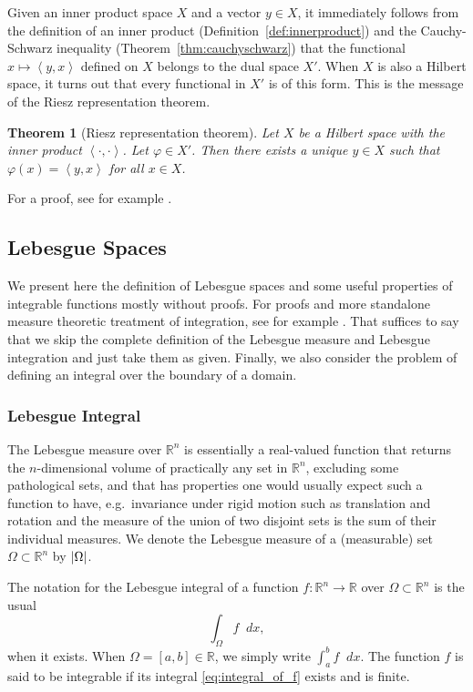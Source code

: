 \documentclass[english, 12pt, a4paper, sci, utf8, a-2b, online]{aaltothesis}
\theoremstyle{definition}
\theoremstyle{plain}
\newtheorem{theorem}{Theorem}[section]
\DeclarePairedDelimiter\abs{\lvert}{\rvert}
\newcommand*{\innerprod}[2]{\left\langle #1, #2 \right\rangle}
\newcommand*\diff{\mathop{}\!d}
\numberwithin{equation}{section}
\begin{document}
Given an inner product space $X$ and a vector $y \in X$,
it immediately follows from the definition
of an inner product (Definition~\ref{def:innerproduct})
and the Cauchy-Schwarz inequality (Theorem~\ref{thm:cauchyschwarz})
that the functional $x \mapsto \innerprod{y}{x}$ defined on $X$
belongs to the dual space $X'$. When $X$ is also a Hilbert space,
it turns out that every functional in $X'$ is of this form.
This is the message of the Riesz representation theorem.
\begin{theorem}[Riesz representation theorem]
    \label{thm:rieszrepresentationtheorem}
    Let $X$ be a Hilbert space with the inner product $\innerprod{\cdot}{\cdot}$.
    Let $\varphi \in X'$. Then there exists a unique $y \in X$ such that
    $\varphi(x) = \innerprod{y}{x}$ for all $x \in X$.
\end{theorem}
For a proof, see for example \cite[Theorem~4.12 on p.~81]{rudin1986}.

\subsection{Lebesgue Spaces}
\label{subsec:lebesguespaces}

We present here the definition of
Lebesgue spaces and some useful properties of integrable functions mostly
without proofs. For proofs and more standalone measure theoretic treatment
of integration, see for example \cite{folland1999}. That suffices to say that
we skip the complete definition of the Lebesgue measure and Lebesgue integration
and just take them as given. Finally, we also consider the problem of defining an 
integral over the boundary of a domain.

\subsubsection{Lebesgue Integral}
\label{subsubsec:lebesgueintegral}

The Lebesgue measure over $\mathbb{R}^n$ is essentially a real-valued function
that returns the $n$-dimensional volume of practically any set in $\mathbb{R}^n$,
excluding some pathological sets, and that has properties one would usually
expect such a function to have, e.g.\
invariance under rigid motion such as translation and rotation
and the measure of the union of two disjoint
sets is the sum of their individual measures. We denote the Lebesgue measure
of a (measurable) set $\Omega \subset \mathbb{R}^n$ by $\abs{\Omega}$.

The notation for the Lebesgue integral of a function
$f: \mathbb{R}^n \to \mathbb{R}$ over $\Omega \subset \mathbb{R}^n$
is the usual
\begin{equation}
    \label{eq:integral_of_f}
    \int_{\Omega} f \diff x,
\end{equation}
when it exists. When $\Omega = [a,b] \in \mathbb{R}$,
we simply write $\int_{a}^{b} f \diff x$.
The function $f$ is said to be integrable if its integral \eqref{eq:integral_of_f}
exists and is finite.
\end{document}
